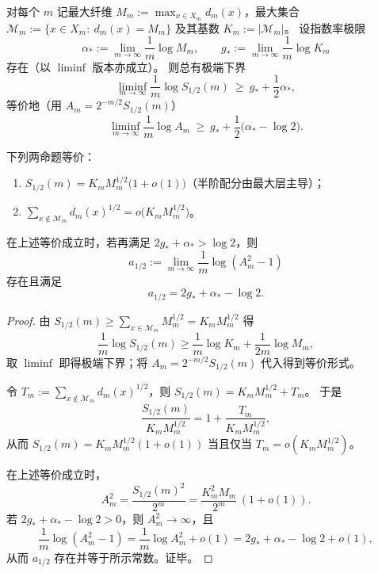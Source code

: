\begin{theorem}[半阶压强的极端下界与平方根冻结判据]\label{thm:pom-half-order-pressure-extreme-lower-bound-sqrt-freezing}
对每个 \(m\) 记最大纤维 \(M_m:=\max_{x\in X_m}d_m(x)\)，最大集合
\(
\mathcal{M}_m:=\{x\in X_m:\ d_m(x)=M_m\}
\)
及其基数 \(K_m:=|\mathcal{M}_m|\)。
设指数率极限
\[
\alpha_*:=\lim_{m\to\infty}\frac{1}{m}\log M_m,\qquad
g_*:=\lim_{m\to\infty}\frac{1}{m}\log K_m
\]
存在（以 \(\liminf\) 版本亦成立）。
则总有极端下界
\[
\liminf_{m\to\infty}\frac{1}{m}\log S_{1/2}(m)\ \ge\ g_*+\frac{1}{2}\alpha_*,
\]
等价地（用 \(A_m=2^{-m/2}S_{1/2}(m)\)）
\[
\liminf_{m\to\infty}\frac{1}{m}\log A_m\ \ge\ g_*+\frac{1}{2}\bigl(\alpha_*-\log 2\bigr).
\]
\par
下列两命题等价：
\begin{enumerate}
  \item \(\displaystyle S_{1/2}(m)=K_m M_m^{1/2}\bigl(1+o(1)\bigr)\)（半阶配分由最大层主导）；
  \item \(\displaystyle \sum_{x\notin\mathcal{M}_m} d_m(x)^{1/2}=o\bigl(K_m M_m^{1/2}\bigr)\)。
\end{enumerate}
在上述等价成立时，若再满足 \(2g_*+\alpha_*>\log 2\)，则
\[
a_{1/2}:=\lim_{m\to\infty}\frac{1}{m}\log(A_m^2-1)
\]
存在且满足
\[
a_{1/2}=2g_*+\alpha_*-\log 2.
\]
\end{theorem}
\begin{proof}
由 \(S_{1/2}(m)\ge \sum_{x\in\mathcal{M}_m} M_m^{1/2}=K_m M_m^{1/2}\) 得
\[
\frac{1}{m}\log S_{1/2}(m)\ge \frac{1}{m}\log K_m+\frac{1}{2m}\log M_m,
\]
取 \(\liminf\) 即得极端下界；将 \(A_m=2^{-m/2}S_{1/2}(m)\) 代入得到等价形式。
\par
令
\(
T_m:=\sum_{x\notin\mathcal{M}_m} d_m(x)^{1/2}
\)，则 \(S_{1/2}(m)=K_m M_m^{1/2}+T_m\)。
于是
\[
\frac{S_{1/2}(m)}{K_m M_m^{1/2}}=1+\frac{T_m}{K_m M_m^{1/2}},
\]
从而 \(S_{1/2}(m)=K_m M_m^{1/2}(1+o(1))\) 当且仅当 \(T_m=o(K_m M_m^{1/2})\)。
\par
在上述等价成立时，
\[
A_m^2
=\frac{S_{1/2}(m)^2}{2^m}
=\frac{K_m^2 M_m}{2^m}\,(1+o(1)).
\]
若 \(2g_*+\alpha_*-\log 2>0\)，则 \(A_m^2\to\infty\)，且
\[
\frac{1}{m}\log(A_m^2-1)
=\frac{1}{m}\log A_m^2+o(1)
=2g_*+\alpha_*-\log 2+o(1),
\]
从而 \(a_{1/2}\) 存在并等于所示常数。证毕。
\end{proof}

